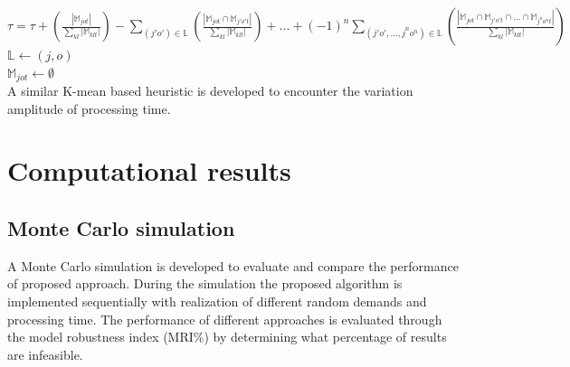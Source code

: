\documentclass[letterpaper]{article} %
\begin{document}
$\tau=\tau+\left(\frac{|\mathbb{M}_{jot}|}{\sum_{kl} |\mathbb{M}_{klt}|} \right)-\sum_{(j'o')\in \mathbb{L}} \left(\frac{|\mathbb{M}_{jot} \cap \mathbb{M}_{j'o't}|}{\sum_{kl} |\mathbb{M}_{klt}|} \right)+...+(-1)^n \sum_{(j'o',...,j^{n}o^{n})\in \mathbb{L}} \left(\frac{|\mathbb{M}_{jot} \cap \mathbb{M}_{j'o't}\cap ... \cap \mathbb{M}_{j^{n}o^{n}t}|}{\sum_{kl} |\mathbb{M}_{klt}|} \right)$\\
$\mathbb{L} \leftarrow (j,o)$\\
$\mathbb{M}_{jot} \leftarrow \emptyset$\\

A similar K-mean based heuristic is developed to encounter the variation amplitude of processing time.

\section{Computational results}
\subsection{Monte Carlo simulation}
A Monte Carlo simulation is developed to evaluate and compare the performance of proposed approach. During the simulation the proposed algorithm is implemented sequentially with realization of different random demands and processing time. The performance of different approaches is evaluated through the model robustness index (MRI\%) by determining what percentage of results are infeasible.
\end{document}
